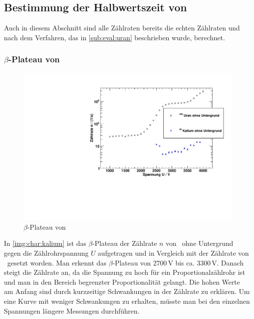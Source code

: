 \subsection{Bestimmung der Halbwertszeit von \kalium}
Auch in diesem Abschnitt sind alle Zählraten bereits die echten Zählraten und nach dem Verfahren, das in \ref{sub:eval:uran} beschrieben wurde, 
berechnet.
\subsubsection{$\beta$-Plateau von \kalium}
\begin{figure}[H]
\begin{center}
  \includegraphics[width=15cm]{../img/Kalium40_Charakteristik.pdf}
  \caption[$\beta$-Plateau mit \kalium]{$\beta$-Plateau von \kalium}
  \label{img:char:kalium}
\end{center}
\end{figure}
In \autoref{img:char:kalium} ist das $\beta$-Plateau der Zählrate $n$ von \kalium\, ohne Untergrund gegen die Zählrohrspannung $U$ aufgetragen 
und in Vergleich mit der Zählrate von \uran\, gesetzt worden. Man erkennt das $\beta$-Plateau von $2700\,$V bis ca. $3300\,$V. Danach steigt die 
Zählrate an, da die Spannung zu hoch für ein Proportionalzählrohr ist und man in den Bereich begrenzter Proportionalität gelangt. Die hohen Werte 
am Anfang sind durch kurzzeitige Schwankungen in der Zählrate zu erklären. Um eine Kurve mit weniger Schwankungen zu erhalten, müsste man bei den 
einzelnen Spannungen längere Messungen durchführen.

